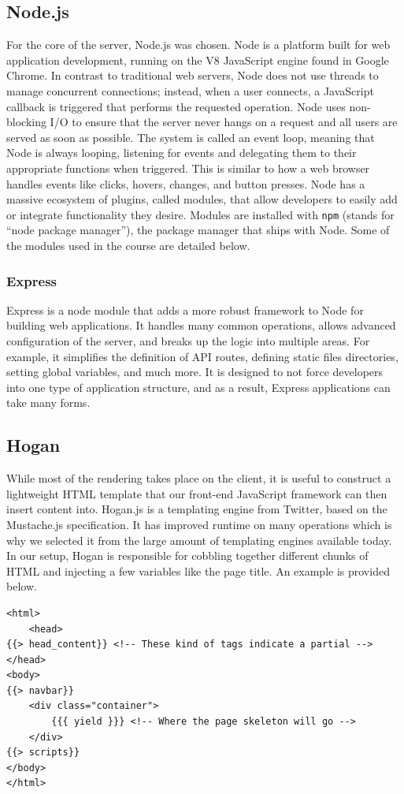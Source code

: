 \documentclass[12pt]{article}
\newcommand{\code}[1]{{\texttt {#1}}}
\begin{document}
\subsection{Node.js}\label{sec:node}
For the core of the server, Node.js was chosen. Node is a platform built for web application development, running on the V8 JavaScript engine found in Google Chrome. In contrast to traditional web servers, Node does not use threads to manage concurrent connections; instead, when a user connects, a JavaScript callback is triggered that performs the requested operation. Node uses non-blocking I/O to ensure that the server never hangs on a request and all users are served as soon as possible. The system is called an event loop, meaning that Node is always looping, listening for events and delegating them to their appropriate functions when triggered. This is similar to how a web browser handles events like clicks, hovers, changes, and button presses. Node has a massive ecosystem of plugins, called modules, that allow developers to easily add or integrate functionality they desire. Modules are installed with \code{npm} (stands for ``node package manager''), the package manager that ships with Node. Some of the modules used in the course are detailed below.

\subsubsection{Express}\label{sec:express}
Express is a node module that adds a more robust framework to Node for building web applications. It handles many common operations, allows advanced configuration of the server, and breaks up the logic into multiple areas.  For example, it simplifies the definition of API routes, defining static files directories, setting global variables, and much more. It is designed to not force developers into one type of application structure, and as a result, Express applications can take many forms.

\subsection{Hogan}\label{sec:hogan}
While most of the rendering takes place on the client, it is useful to construct a lightweight HTML template that our front-end JavaScript framework can then insert content into. Hogan.js is a templating engine from Twitter, based on the Mustache.js specification. It has improved runtime on many operations which is why we selected it from the large amount of templating engines available today. In our setup, Hogan is responsible for cobbling together different chunks of HTML and injecting a few variables like the page title. An example is provided below.
\begin{verbatim}
<html>
	<head>
{{> head_content}} <!-- These kind of tags indicate a partial -->
</head>
<body>
{{> navbar}} 
    <div class="container">
        {{{ yield }}} <!-- Where the page skeleton will go -->
    </div>
{{> scripts}}
</body>
</html>
\end{verbatim}
\end{document}
